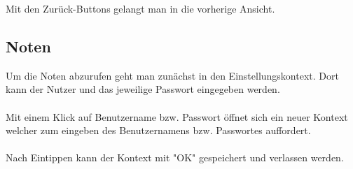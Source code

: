 Mit den Zurück-Buttons gelangt man in die vorherige Ansicht.

\newpage
\subsection{Noten}

Um die Noten abzurufen geht man zunächst in den Einstellungskontext. Dort kann der Nutzer und das jeweilige Passwort eingegeben werden.
\\
\\
Mit einem Klick auf Benutzername bzw. Passwort öffnet sich ein neuer Kontext welcher zum eingeben des Benutzernamens bzw. Passwortes auffordert.
\\
\\
Nach Eintippen kann der Kontext mit "OK" gespeichert und verlassen werden.


